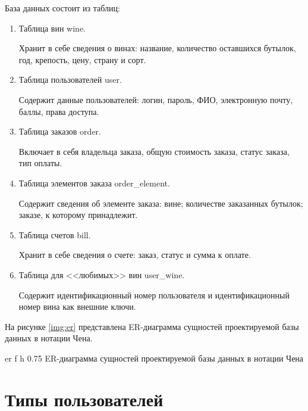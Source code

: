 База данных состоит из таблиц:
\begin{enumerate}[label=\arabic*)]
	\item Таблица вин wine.

 Хранит в себе сведения о винах: название, количество оставшихся бутылок, год, крепость, цену, страну и сорт.
 
	\item Таблица пользователей user.

  Содержит данные пользователей: логин, пароль, ФИО, электронную почту, баллы, права доступа.
  
	\item Таблица заказов order.

Включает в себя владельца заказа, общую стоимость заказа, статус заказа, тип оплаты.

        \item Таблица элементов заказа order\_element.

Содержит сведения об элементе заказа: вине; количестве заказанных бутылок; заказе, к которому принадлежит.
        
        \item Таблица счетов bill.

Хранит в себе сведения о счете: заказ, статус и сумма к оплате.    

        \item Таблица для <<любимых>> вин user\_wine.

        Содержит идентификационный номер пользователя и идентификационный номер вина как внешние ключи.
\end{enumerate}

На рисунке \ref{img:er} представлена ER-диаграмма сущностей проектируемой базы данных в нотации Чена.

    {er} %
    {f} %
    {h} %
    {0.75\textwidth} %
    {ER-диаграмма сущностей проектируемой базы данных в нотации Чена} %
\newpage

\section{Типы пользователей}

